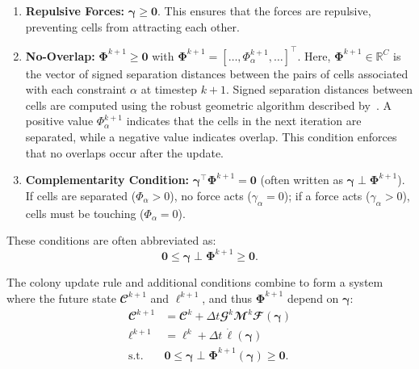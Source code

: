 \documentclass[a4paper,fleqn]{cas-dc}
\begin{document}
\begin{enumerate}
    \item \textbf{Repulsive Forces:} $\boldsymbol{\gamma} \geq \mathbf{0}$. This ensures that the forces are repulsive, preventing cells from attracting each other.
    \item \textbf{No-Overlap:} $\mathbf{\Phi}^{k+1} \geq \mathbf{0}$ with $\mathbf{\Phi}^{k+1} = [\dots, \Phi_\alpha^{k+1}, \dots]^\top$. Here, $\mathbf{\Phi}^{k+1} \in \mathbb{R}^{C}$ is the vector of signed separation distances between the pairs of cells associated with each constraint $\alpha$ at timestep $k+1$. Signed separation distances between cells are computed using the robust geometric algorithm described by~\cite{Yan2019, GeometricTools}.
          A positive value $\Phi_\alpha^{k+1}$ indicates that the cells in the next iteration are separated, while a negative value indicates overlap. This condition enforces that no overlaps occur after the update.
    \item \textbf{Complementarity Condition:}  $\boldsymbol{\gamma}^\top \mathbf{\Phi}^{k+1} = \mathbf{0}$ (often written as $\boldsymbol{\gamma} \perp \mathbf{\Phi}^{k+1}$). If cells are separated ($\Phi_\alpha > 0$), no force acts ($\gamma_\alpha = 0$); if a force acts ($\gamma_\alpha > 0$), cells must be touching ($\Phi_\alpha = 0$).
\end{enumerate}

These conditions are often abbreviated as:
\begin{equation}
    \mathbf{0} \leq \boldsymbol{\gamma} \perp \mathbf{\Phi}^{k+1} \geq \mathbf{0}.
\end{equation}


The colony update rule and additional conditions combine to form a system where the future state $\mathbfcal{C}^{k+1}$ and $\boldsymbol{\ell}^{k+1}$, and thus $\mathbf{\Phi}^{k+1}$ depend on $\boldsymbol{\gamma}$:
\begin{equation} \label{eq:colony_update_with_constraints}
    \begin{split}
        \mathbfcal{C}^{k+1} & = \mathbfcal{C}^k + \Delta t \mathbfcal{G}^k \mathbfcal{M}^k \mathbfcal{F}(\boldsymbol{\gamma})  \\
        \boldsymbol{\ell}^{k+1} & = \boldsymbol{\ell}^k + \Delta t \, \dot{\boldsymbol{\ell}}(\boldsymbol{\gamma}) \\
        \text{s.t.} \quad & \mathbf{0} \leq \boldsymbol{\gamma} \perp \mathbf{\Phi}^{k+1}(\boldsymbol{\gamma}) \geq \mathbf{0}.
    \end{split}
\end{equation}
\end{document}
